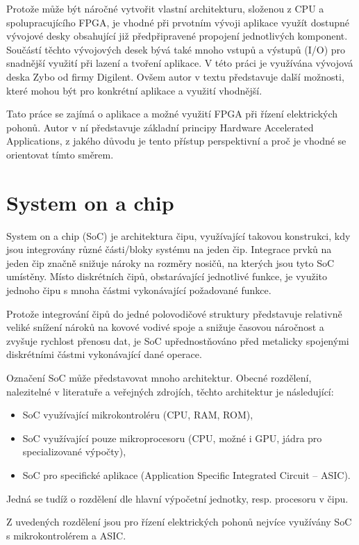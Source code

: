 \documentclass[a4paper, twoside, 11pt]{article}
\begin{document}
Protože může být náročné vytvořit vlastní architekturu, složenou z CPU a spolupracujícího FPGA, je vhodné při prvotním vývoji aplikace využít dostupné vývojové desky obsahující již předpřipravené propojení jednotlivých komponent. Součástí těchto vývojových desek bývá také mnoho vstupů a výstupů (I/O) pro snadnější využití při lazení a tvoření aplikace. V této práci je využívána vývojová deska Zybo od firmy Digilent. Ovšem autor v textu představuje další možnosti, které mohou být pro konkrétní aplikace a využití vhodnější.\par
Tato práce se zajímá o aplikace a možné využití FPGA při řízení elektrických pohonů. Autor v ní představuje základní principy Hardware Accelerated Applications, z jakého důvodu je tento přístup perspektivní a proč je vhodné se orientovat tímto směrem.\par
\flushbottom %
\newpage

\section{System on a chip}
	System on a chip (SoC) je architektura čipu, využívající takovou konstrukci, kdy jsou integrovány různé části/bloky systému na jeden čip. Integrace prvků na jeden čip značně snižuje nároky na rozměry nosičů, na kterých jsou tyto SoC umístěny. Místo diskrétních čipů, obstarávající jednotlivé funkce, je využito jednoho čipu s mnoha částmi vykonávající požadované funkce.\par
	Protože integrování čipů do jedné polovodičové struktury představuje relativně veliké snížení nároků na kovové vodivé spoje a snižuje časovou náročnost a zvyšuje rychlost přenosu dat, je SoC upřednostňováno před metalicky spojenými diskrétními částmi vykonávající dané operace.\par
	Označení SoC může představovat mnoho architektur. Obecné rozdělení, nalezitelné v literatuře a veřejných zdrojích, těchto architektur je následující:
	\begin{itemize}
		\item SoC využívající mikrokontroléru (CPU, RAM, ROM),
		\item SoC využívající pouze mikroprocesoru (CPU, možné i GPU, jádra pro specializované výpočty),
		\item SoC pro specifické aplikace (Application Specific Integrated Circuit – ASIC).
	\end{itemize}
	Jedná se tudíž o rozdělení dle hlavní výpočetní jednotky, resp. procesoru v čipu. \cite{tomshardware-system-on-chip}\par
	Z uvedených rozdělení jsou pro řízení elektrických pohonů nejvíce využívány SoC s mikrokontrolérem a ASIC.
\end{document}
